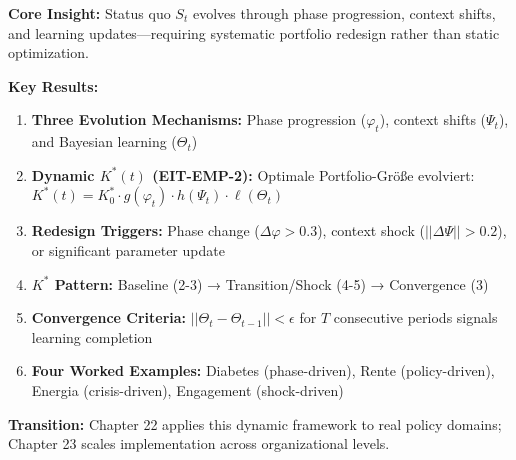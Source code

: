 \begin{tcolorbox}[colback=blue!5!white, colframe=blue!75!black,
    title={\textbf{Chapter 21 Summary: Dynamic Portfolio Evolution}}]

\textbf{Core Insight:} Status quo $S_t$ evolves through phase progression, context shifts, and learning updates---requiring systematic portfolio redesign rather than static optimization.

\textbf{Key Results:}
\begin{enumerate}[nosep]
    \item \textbf{Three Evolution Mechanisms:} Phase progression ($\varphi_t$), context shifts ($\Psi_t$), and Bayesian learning ($\Theta_t$)
    \item \textbf{Dynamic $K^*(t)$ (EIT-EMP-2):} Optimale Portfolio-Größe evolviert: $K^*(t) = K^*_0 \cdot g(\varphi_t) \cdot h(\Psi_t) \cdot \ell(\Theta_t)$
    \item \textbf{Redesign Triggers:} Phase change ($\Delta\varphi > 0.3$), context shock ($||\Delta\Psi|| > 0.2$), or significant parameter update
    \item \textbf{$K^*$ Pattern:} Baseline (2-3) → Transition/Shock (4-5) → Convergence (3)
    \item \textbf{Convergence Criteria:} $||\Theta_t - \Theta_{t-1}|| < \epsilon$ for $T$ consecutive periods signals learning completion
    \item \textbf{Four Worked Examples:} Diabetes (phase-driven), Rente (policy-driven), Energia (crisis-driven), Engagement (shock-driven)
\end{enumerate}

\textbf{Transition:} Chapter 22 applies this dynamic framework to real policy domains; Chapter 23 scales implementation across organizational levels.

\end{tcolorbox}

